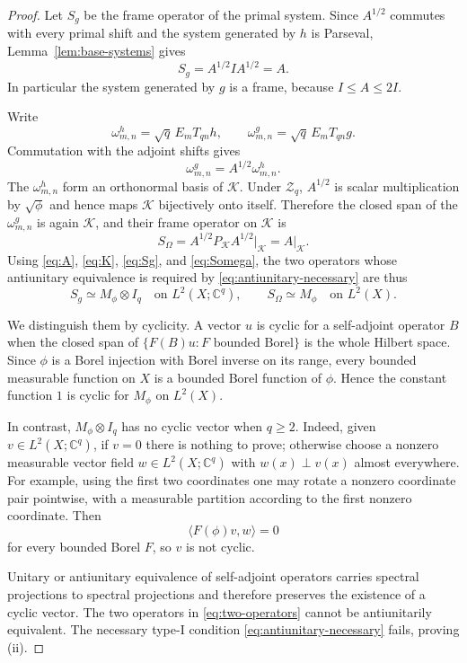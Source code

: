 \documentclass[11pt]{article}
\newcommand{\C}{\mathbb C}
\newcommand{\cK}{\mathcal K}
\newcommand{\Zak}{\mathcal Z_q}
\begin{document}
\begin{proof}
Let $S_g$ be the frame operator of the primal system.  Since $A^{1/2}$
commutes with every primal shift and the system generated by $h$ is Parseval,
Lemma~\ref{lem:base-systems} gives
\begin{equation}\label{eq:Sg}
 S_g=A^{1/2}I A^{1/2}=A.
\end{equation}
In particular the system generated by $g$ is a frame, because
$I\le A\le2I$.

Write
\[
 \omega^h_{m,n}=\sqrt q\,E_mT_{qn}h,
 \qquad
 \omega^g_{m,n}=\sqrt q\,E_mT_{qn}g.
\]
Commutation with the adjoint shifts gives
\begin{equation}\label{eq:adj-deform}
 \omega^g_{m,n}=A^{1/2}\omega^h_{m,n}.
\end{equation}
The $\omega^h_{m,n}$ form an orthonormal basis of $\cK$.  Under $\Zak$,
$A^{1/2}$ is scalar multiplication by $\sqrt\phi$ and hence maps $\cK$
bijectively onto itself.  Therefore the closed span of the
$\omega^g_{m,n}$ is again $\cK$, and their frame operator on $\cK$ is
\begin{equation}\label{eq:Somega}
 S_\Omega=A^{1/2}P_\cK A^{1/2}\big|_\cK
 =A\big|_\cK.
\end{equation}
Using \eqref{eq:A}, \eqref{eq:K}, \eqref{eq:Sg}, and
\eqref{eq:Somega}, the two operators whose antiunitary equivalence is
required by \eqref{eq:antiunitary-necessary} are thus
\begin{equation}\label{eq:two-operators}
 S_g\simeq M_\phi\otimes I_q
 \quad\text{on }L^2(X;\C^q),
 \qquad
 S_\Omega\simeq M_\phi
 \quad\text{on }L^2(X).
\end{equation}

We distinguish them by cyclicity.  A vector $u$ is cyclic for a self-adjoint
operator $B$ when the closed span of
$\{F(B)u:F\text{ bounded Borel}\}$ is the whole Hilbert space.  Since
$\phi$ is a Borel injection with Borel inverse on its range, every bounded
measurable function on $X$ is a bounded Borel function of $\phi$.  Hence the
constant function $1$ is cyclic for $M_\phi$ on $L^2(X)$.

In contrast, $M_\phi\otimes I_q$ has no cyclic vector when $q\ge2$.
Indeed, given $v\in L^2(X;\C^q)$, if $v=0$ there is nothing to prove; otherwise
choose a nonzero measurable vector field $w\in L^2(X;\C^q)$ with
$w(x)\perp v(x)$ almost everywhere.  For example, using the first two
coordinates one may rotate a nonzero coordinate pair pointwise, with a
measurable partition according to the first nonzero coordinate.  Then
\[
 \langle F(\phi)v,w\rangle=0
\]
for every bounded Borel $F$, so $v$ is not cyclic.

Unitary or antiunitary equivalence of self-adjoint operators carries spectral
projections to spectral projections and therefore preserves the existence of
a cyclic vector.  The two operators in \eqref{eq:two-operators} cannot be
antiunitarily equivalent.  The necessary type-I condition
\eqref{eq:antiunitary-necessary} fails, proving (ii).
\end{proof}
\end{document}
